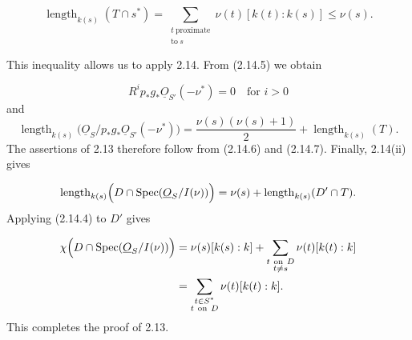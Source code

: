 \begin{equation*}
\operatorname{length}_{k(s)}(T\cap s^*)
=\sum_{\substack{t\ \mathrm{proximate}\\\mathrm{to}\ s}}
\nu(t)[k(t):k(s)]
\leq\nu(s).
\end{equation*}


This inequality allows us to apply 2.14.  From (2.14.5) we obtain

\begin{equation*}
R^ip_*g_*\underline{O}_{S'}(-\nu^*)=0
\quad\text{for }i>0
\end{equation*}
and
\begin{equation*}
\operatorname{length}_{k(s)}
\bigl(\underline{O}_S/p_*g_*\underline{O}_{S'}(-\nu^*)\bigr)
=\frac{\nu(s)(\nu(s)+1)}2+\operatorname{length}_{k(s)}(T).
\end{equation*}
The assertions of 2.13 therefore follow from (2.14.6) and (2.14.7).  Finally,
2.14(ii) gives

\begin{equation*}
\operatorname{length}_{k(s)}
\Bigl(D\cap\operatorname{Spec}(\underline{O}_S/I(\nu))\Bigr)
=\nu(s)+\operatorname{length}_{k(s)}(D'\cap T).
\end{equation*}
Applying (2.14.4) to $D'$ gives

\begin{equation*}
\begin{aligned}
\chi\Bigl(D\cap\operatorname{Spec}(\underline{O}_S/I(\nu))\Bigr)
&=\nu(s)[k(s):k]
+\sum_{\substack{t\ \mathrm{on}\ D\\t\ne s}}
\nu(t)[k(t):k]\\
&=\sum_{\substack{t\in S^*\\t\ \mathrm{on}\ D}}
\nu(t)[k(t):k].
\end{aligned}
\end{equation*}
This completes the proof of 2.13.
